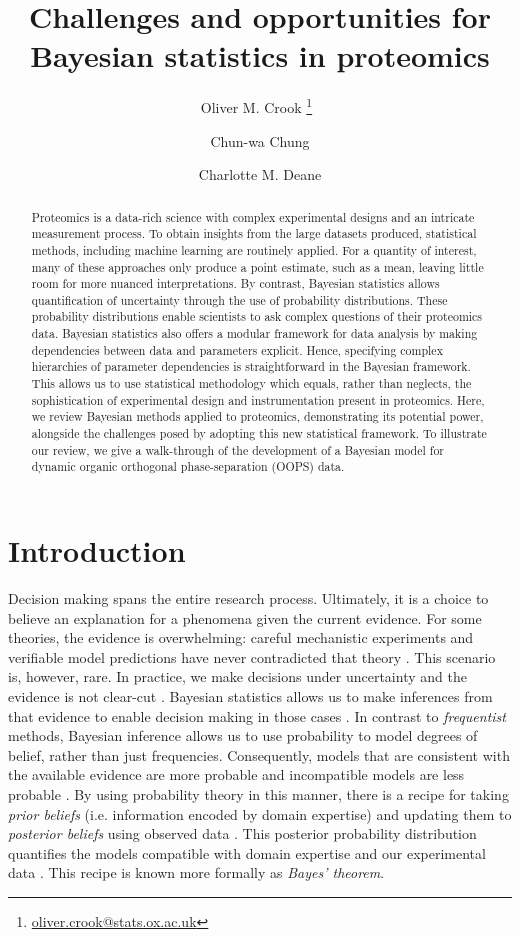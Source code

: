 \documentclass[12pt,english, journal=jpr, layout=twocolumn]{article}
\title{Challenges and opportunities for Bayesian statistics in proteomics}
\author[1]{Oliver M. Crook \thanks{\url{oliver.crook@stats.ox.ac.uk}}~}
\author[2]{Chun-wa Chung}
\author[1]{Charlotte M. Deane}
\affil[1]{Department of Statistics, University of Oxford, Oxford, UK}
\affil[2]{Structural and Biophysical Sciences, GlaxoSmithKline R\&D, Stevenage, UK}
\begin{document}
\maketitle
\begin{abstract}
Proteomics is a data-rich science with complex experimental designs and an intricate measurement process. To obtain insights from the large datasets produced, statistical methods, including machine learning are routinely applied. For a quantity of interest, many of these approaches only produce a point estimate, such as a mean, leaving little room for more nuanced interpretations. By contrast, Bayesian statistics allows quantification of uncertainty through the use of probability distributions. These probability distributions enable scientists to ask complex questions of their proteomics data. Bayesian statistics also offers a modular framework for data analysis by making dependencies between data and parameters explicit. Hence, specifying complex hierarchies of parameter dependencies is straightforward in the Bayesian framework. This allows us to use statistical methodology which equals, rather than neglects, the sophistication of experimental design and instrumentation present in proteomics. Here, we review Bayesian methods applied to proteomics, demonstrating its potential power, alongside the challenges posed by adopting this new statistical framework. To illustrate our review, we give a walk-through of the development of a Bayesian model for dynamic organic orthogonal phase-separation (OOPS) data.      
\end{abstract}
\section{Introduction}
Decision making spans the entire research process. Ultimately, it is a choice to believe an explanation for a phenomena given the current evidence. For some theories, the evidence is overwhelming: careful mechanistic experiments and verifiable model predictions have never contradicted that theory \citep{Wilkie::1974}. This scenario is, however, rare. In practice, we make decisions under uncertainty and the evidence is not clear-cut \citep{Tversky::1974}. Bayesian statistics allows us to make inferences from that evidence to enable decision making in those cases \citep{Gelman::1995}. In contrast to \textit{frequentist} methods, Bayesian inference allows us to use probability to model degrees of belief, rather than just frequencies. Consequently, models that are consistent with the available evidence are more probable and incompatible models are less probable \citep{Gelman::2020, Schad::2021}. By using probability theory in this manner, there is a recipe for taking \textit{prior beliefs} (i.e. information encoded by domain expertise) and updating them to \textit{posterior beliefs} using observed data \citep{Gelman::1995}. This posterior probability distribution quantifies the models compatible with domain expertise and our experimental data \citep{Gelman::2020}. This recipe is known more formally as \textit{Bayes' theorem}. 
\end{document}
